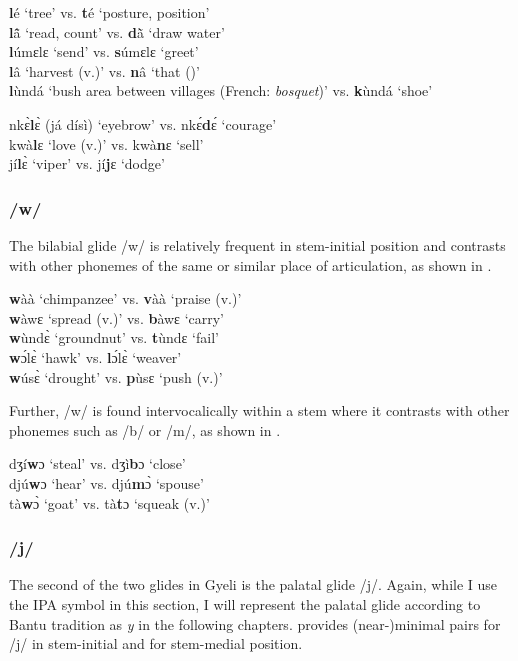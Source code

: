 \ea \label{l}
{\bfseries l}é `tree' vs. {\bfseries t}é `posture, position' \\
{\bfseries l}ã̂ `read, count' vs. {\bfseries d}ã̀ `draw water' \\
{\bfseries l}úmɛlɛ `send' vs. {\bfseries s}úmɛlɛ `greet' \\
{\bfseries l}â `harvest (v.)' vs. {\bfseries n}â `that ({\COMP})' \\
{\bfseries l}ùndá `bush area between villages (French: {\itshape bosquet})' vs. {\bfseries k}ùndá `shoe' 
\z

\ea \label{lm}
nkɛ̀{\bfseries l}ɛ̀ (já dísì) `eyebrow' vs. nkɛ́{\bfseries d}ɛ́ `courage' \\
kwà{\bfseries l}ɛ `love (v.)' vs. kwà{\bfseries n}ɛ `sell' \\
jí{\bfseries l}ɛ̀ `viper' vs. jí{\bfseries j}ɛ `dodge'
\z

\subsubsection*{\bfseries /w/} The bilabial glide /w/ is relatively frequent in stem-initial position and contrasts with other phonemes of the same or similar place of articulation, as shown in .

\ea \label{wini}
{\bfseries w}àà `chimpanzee' vs. {\bfseries v}àà `praise (v.)' \\
{\bfseries w}àwɛ `spread (v.)' vs. {\bfseries b}àwɛ `carry' \\
{\bfseries w}ùndɛ̀ `groundnut' vs. {\bfseries t}ùndɛ `fail' \\
{\bfseries w}ɔ́lɛ̀ `hawk' vs. {\bfseries l}ɔ́lɛ̀ `weaver' \\
{\bfseries w}úsɛ̀ `drought' vs. {\bfseries p}ùsɛ `push (v.)' 
\z

\noindent Further, /w/ is found intervocalically within a stem where it contrasts with other phonemes such as /b/ or /m/, as shown in .

\ea \label{wm}
dʒí{\bfseries w}ɔ `steal' vs. dʒì{\bfseries b}ɔ `close' \\
djú{\bfseries w}ɔ `hear' vs. djú{\bfseries m}ɔ̀ `spouse' \\
tà{\bfseries w}ɔ̀ `goat' vs. tà{\bfseries t}ɔ `squeak (v.)' 
\z

\subsubsection*{\bfseries /j/} The second of the two glides in Gyeli is the palatal glide /j/. Again, while I use the IPA symbol in this section, I will represent the palatal glide according to Bantu tradition as {\itshape y} in the following chapters.  provides (near-)minimal pairs for /j/ in stem-initial and  for stem-medial position.

